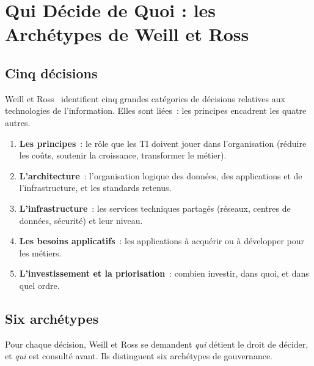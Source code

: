 \section{Qui Décide de Quoi : les Archétypes de Weill et Ross}
\label{sec:c03-weill-ross}

\subsection{Cinq décisions}

Weill et Ross~\cite{weill2004itgovernance} identifient cinq grandes
catégories de décisions relatives aux technologies de l'information.
Elles sont liées~: les principes encadrent les quatre autres.

\begin{enumerate}
    \item \textbf{Les principes}~: le rôle que les TI doivent jouer dans
          l'organisation (réduire les coûts, soutenir la croissance,
          transformer le métier).
    \item \textbf{L'architecture}~: l'organisation logique des données, des
          applications et de l'infrastructure, et les standards retenus.
    \item \textbf{L'infrastructure}~: les services techniques partagés
          (réseaux, centres de données, sécurité) et leur niveau.
    \item \textbf{Les besoins applicatifs}~: les applications à acquérir ou
          à développer pour les métiers.
    \item \textbf{L'investissement et la priorisation}~: combien investir,
          dans quoi, et dans quel ordre.
\end{enumerate}

\subsection{Six archétypes}

Pour chaque décision, Weill et Ross se demandent \emph{qui} détient le
droit de décider, et \emph{qui} est consulté avant. Ils distinguent six
archétypes de gouvernance.

